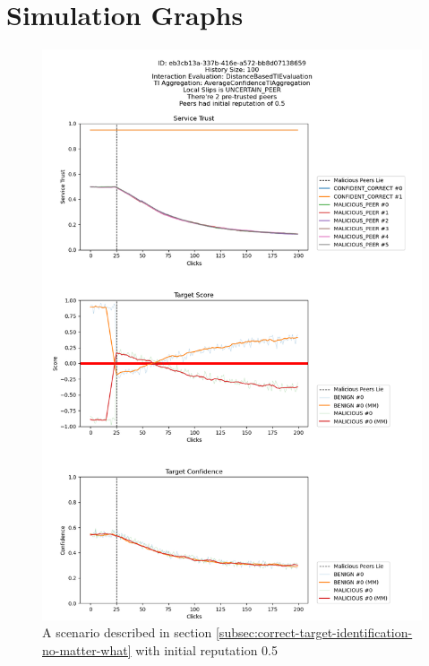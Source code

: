 \appendix
\chapter{Simulation Graphs}

\begin{figure}
    \centering
    \includegraphics[width=1.0\textwidth]{assets/miss_classification_recovery.png}
    \caption{A scenario described in section \ref{subsec:correct-target-identification-no-matter-what} with initial reputation 0.5}
    \label{fig:missclassification-recovery}
\end{figure}

